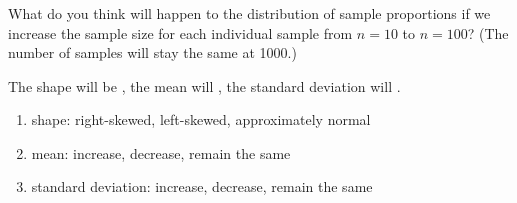 
\begin{frame}
\frametitle{\grp}
What do you think will happen to the distribution of sample proportions if we increase the sample size for each individual sample from $n=10$ to $n=100$? (The number of samples will stay the same at 1000.)
\begin{clicker}{The shape will be \underline{\hspace{1in}}, the mean will \underline{\hspace{1in}}, the standard deviation will \underline{\hspace{1in}}.}
\begin{enumerate}
    \item
    shape: right-skewed, left-skewed, approximately normal
    \item
    mean: increase, decrease, remain the same
    \item
    standard deviation: increase, decrease, remain the same
\end{enumerate}
\end{clicker}
\end{frame}



